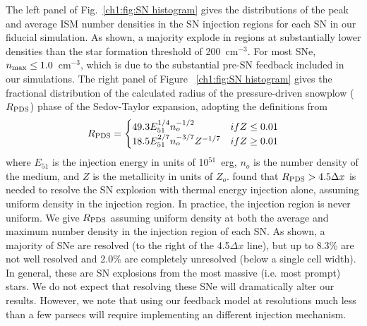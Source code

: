 The left panel of Fig.~\ref{ch1:fig:SN histogram} gives the distributions of the peak and average ISM number densities in the SN injection regions for each SN in our fiducial simulation. As shown, a majority explode in regions at substantially lower densities than the star formation threshold of 200~cm$^{-3}$. For most SNe, $n_{\rm max} \le 1.0$~cm$^{-3}$, which is due to the substantial pre-SN feedback included in our simulations. The right panel of Figure ~\ref{ch1:fig:SN histogram} gives the fractional distribution of the calculated radius of the pressure-driven snowplow ($R_{\rm PDS}$) phase of the Sedov-Taylor expansion, adopting the definitions from \citet{Simpson2016}
\begin{equation}
R_{\rm PDS} =
\begin{cases}
49.3E^{1/4}_{51}n^{-1/2}_{o} & if  Z \le 0.01 \\
18.5E^{2/7}_{51}n^{-3/7}_{o}Z^{-1/7} & if  Z \ge 0.01 \\
\end{cases}
\end{equation}
where $E_{51}$ is the injection energy in units of 10$^{51}$~erg, $n_{o}$ is the number density of the medium, and $Z$ is the metallicity in units of $Z_{o}$. \citet{Simpson2016} found that $R_{\rm PDS} > 4.5 \Delta x$ is needed to resolve the SN explosion with thermal energy injection alone, assuming uniform density in the injection region. In practice, the injection region is never uniform. We give $R_{\rm PDS}$ assuming uniform density at both the average and maximum number density in the injection region of each SN. As shown, a majority of SNe are resolved (to the right of the 4.5$\Delta x$ line), but up to 8.3\% are not well resolved and 2.0\% are completely unresolved (below a single cell width). In general, these are SN explosions from the most massive (i.e. most prompt) stars. We do not expect that resolving these SNe will dramatically alter our results. However, we note that using our feedback model at resolutions much less than a few parsecs will require implementing an different injection mechanism.

